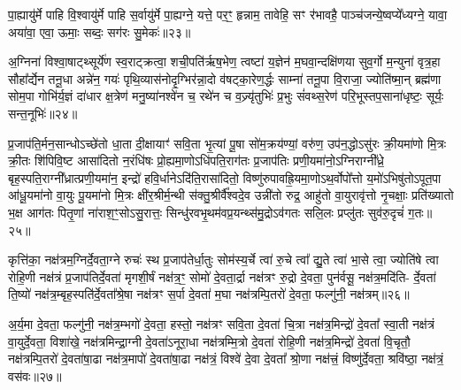 पा॒ह्यायु॑र्मे पाहि वि॒श्वायु॑र्मे पाहि स॒र्वायु॑र्मे पा॒ह्यग्ने॒ यत्ते॒ पर॒ꣳ॒ हृन्नाम॒ तावेहि॒ सꣳ र॑भावहै॒ पाञ्च॑जन्ये॒ष्वप्ये᳚ध्यग्ने॒ यावा॒ अया॑वा॒ एवा॒ ऊमाः॒ सब्दः॒ सग॑रः सु॒मेकः॑॥२३॥

{\anuvakamend[{व्या॒नम्मे॒ द्वात्रिꣳ॑शच्च॥७॥}]}

अ॒ग्निना॑ विश्वा॒षाट्थ्सूर्ये॑ण स्व॒राट्क्रत्वा॒ शची॒पति॑र्\mbox{}ऋष॒भेण॒ त्वष्टा॑ य॒ज्ञेन॑ म॒घवा॒न्दक्षि॑णया सुव॒र्गो म॒न्युना॑ वृत्र॒हा सौहा᳚र्द्येन तनू॒धा अन्ने॑न॒ गयः॑ पृथि॒व्यास॑नोदृ॒ग्भिर॑न्ना॒दो व॑षट्का॒रेण॒र्द्धः साम्ना॑ तनू॒पा वि॒राजा॒ ज्योति॑ष्मा॒न् ब्रह्म॑णा सोम॒पा गोभि॑र्य॒ज्ञं दा॑धार क्ष॒त्रेण॑ मनु॒ष्या॑नश्वे॑न च॒ रथे॑न च व॒ज्र्यृ॑तुभिः॑ प्र॒भुः सं॑वथ्स॒रेण॑ परि॒भूस्तप॒साना॑धृष्टः॒ सूर्यः॒ सन्त॒नूभिः॑॥२४॥

{\anuvakamend[{अ॒ग्निनैका॒न्नप॑ञ्चा॒शत्॥८॥}]}

प्र॒जाप॑ति॒र्मन॒सान्धो\-ऽच्छे॑तो धा॒ता दी॒क्षायाꣳ॑ सवि॒ता भृ॒त्यां पू॒षा सो॑म॒क्रय॑ण्यां॒ वरु॑ण॒ उप॑न॒द्धो\-ऽसु॑रः क्री॒यमा॑णो मि॒त्रः क्री॒तः शि॑पिवि॒ष्ट आसा॑दितो न॒रंधि॑षः प्रो॒ह्यमा॒णो\-ऽधि॑पति॒राग॑तः प्र॒जाप॑तिः प्रणी॒यमा॑नो॒\-ऽग्निराग्नी᳚ध्रे॒ बृह॒स्पति॒राग्नी᳚ध्रात्प्रणी॒यमा॑न॒ इन्द्रो॑ हवि॒र्धाने\-ऽदि॑ति॒रासा॑दितो॒ विष्णु॑रुपावह्रि॒यमा॒णो\-ऽथ॒र्वोपो᳚त्तो य॒मो॑\-ऽभिषु॑तो\-ऽपूत॒पा आ॑धू॒यमा॑नो वा॒युः पू॒यमा॑नो मि॒त्रः क्षी॑र॒श्रीर्म॒न्थी स॑क्तु॒श्रीर्वै᳚श्वदे॒व उन्नी॑तो रुद्र॒ आहु॑तो वा॒युरावृ॑त्तो नृ॒चक्षाः॒ प्रति॑ख्यातो भ॒क्ष आग॑तः पितृ॒णां ना॑राश॒ꣳ॒सो\-ऽसु॒रात्तः॒ सिन्धु॑रवभृ॒थम॑वप्र॒यन्थ्स॑मु॒द्रो\-ऽव॑गतः सलि॒लः प्रप्लु॑तः सुव॑रु॒दृचं॑ ग॒तः॥२५॥

{\anuvakamend[{रु॒द्र एक॑विꣳशतिश्च॥८॥}]}

कृत्ति॑का॒ नक्ष॑त्रम॒ग्निर्दे॒वता॒ग्ने रुचः॑ स्थ प्र॒जाप॑तेर्धा॒तुः सोम॑स्य॒र्चे त्वा॑ रु॒चे त्वा᳚ द्यु॒ते त्वा॑ भा॒से त्वा॒ ज्योति॑षे त्वा रोहि॒णी नक्ष॑त्रं प्र॒जाप॑तिर्दे॒वता॑ मृगशी॒र्\mbox{}षं नक्ष॑त्र॒ꣳ॒ सोमो॑ दे॒वता॒र्द्रा नक्ष॑त्रꣳ रु॒द्रो दे॒वता॒ पुन॑र्वसू॒ नक्ष॑त्र॒मदि॑ति- र्दे॒वता॑ ति॒ष्यो॑ नक्ष॑त्र॒म्बृह॒स्पति॑र्दे॒वता᳚श्रे॒षा नक्ष॑त्रꣳ स॒र्पा दे॒वता॑ म॒घा नक्ष॑त्रम्पि॒तरो॑ दे॒वता॒ फल्गु॑नी॒ नक्ष॑त्रम्॥२६॥

अ॒र्य॒मा दे॒वता॒ फल्गु॑नी॒ नक्ष॑त्र॒म्भगो॑ दे॒वता॒ हस्तो॒ नक्ष॑त्रꣳ सवि॒ता दे॒वता॑ चि॒त्रा नक्ष॑त्र॒मिन्द्रो॑ दे॒वता᳚ स्वा॒ती नक्ष॑त्रं वा॒युर्दे॒वता॒ विशा॑खे॒ नक्ष॑त्रमिन्द्रा॒ग्नी दे॒वता॑\-ऽनूरा॒धा नक्ष॑त्रम्मि॒त्रो दे॒वता॑ रोहि॒णी नक्ष॑त्र॒मिन्द्रो॑ दे॒वता॑ वि॒चृतौ॒ नक्ष॑त्रम्पि॒तरो॑ दे॒वता॑षा॒ढा नक्ष॑त्र॒मापो॑ दे॒वता॑षा॒ढा नक्ष॑त्रं॒ विश्वे॑ दे॒वा दे॒वता᳚ श्रो॒णा नक्ष॑त्त्रं॒ विष्णु॑र्दे॒वता॒ श्रवि॑ष्ठा॒ नक्ष॑त्रं॒ वस॑वः॥२७॥

